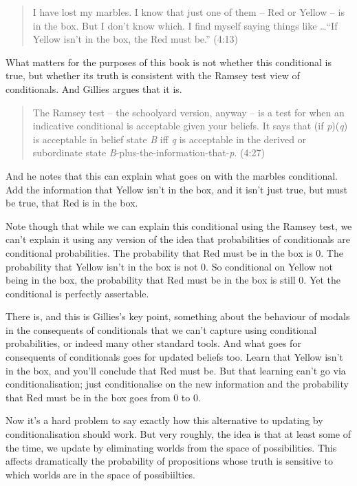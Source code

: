 \documentclass[11pt,]{book}
\begin{document}
\begin{quote}
I have lost my marbles. I know that just one of them -- Red or Yellow -- is in the box. But I don't know which. I find myself saying things like \ldots{}``If Yellow isn't in the box, the Red must be.'' (4:13)
\end{quote}

What matters for the purposes of this book is not whether this conditional is true, but whether its truth is consistent with the Ramsey test view of conditionals. And Gillies argues that it is.

\begin{quote}
The Ramsey test -- the schoolyard version, anyway -- is a test for when an indicative conditional is acceptable given your beliefs. It says that (if \emph{p})(\emph{q}) is acceptable in belief state \emph{B} iff \emph{q} is acceptable in the derived or subordinate state \emph{B}-plus-the-information-that-\emph{p}. (4:27)
\end{quote}

And he notes that this can explain what goes on with the marbles conditional. Add the information that Yellow isn't in the box, and it isn't just true, but must be true, that Red is in the box.

Note though that while we can explain this conditional using the Ramsey test, we can't explain it using any version of the idea that probabilities of conditionals are conditional probabilities. The probability that Red must be in the box is 0. The probability that Yellow isn't in the box is not 0. So conditional on Yellow not being in the box, the probability that Red must be in the box is still 0. Yet the conditional is perfectly assertable.

There is, and this is Gillies's key point, something about the behaviour of modals in the consequents of conditionals that we can't capture using conditional probabilities, or indeed many other standard tools. And what goes for consequents of conditionals goes for updated beliefs too. Learn that Yellow isn't in the box, and you'll conclude that Red must be. But that learning can't go via conditionalisation; just conditionalise on the new information and the probability that Red must be in the box goes from 0 to 0.

Now it's a hard problem to say exactly how this alternative to updating by conditionalisation should work. But very roughly, the idea is that at least some of the time, we update by eliminating worlds from the space of possibilities. This affects dramatically the probability of propositions whose truth is sensitive to which worlds are in the space of possibiilties.
\end{document}
